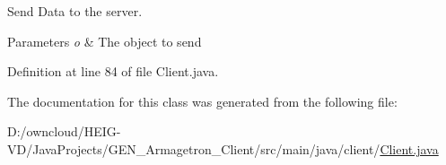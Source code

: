 Send Data to the server. 


\begin{DoxyParams}{Parameters}
{\em o} & The object to send \\
\hline
\end{DoxyParams}


Definition at line 84 of file Client.\+java.



The documentation for this class was generated from the following file\+:\begin{DoxyCompactItemize}
\item 
D\+:/owncloud/\+H\+E\+I\+G-\/\+V\+D/\+Java\+Projects/\+G\+E\+N\+\_\+\+Armagetron\+\_\+\+Client/src/main/java/client/\hyperlink{_client_8java}{Client.\+java}\end{DoxyCompactItemize}
